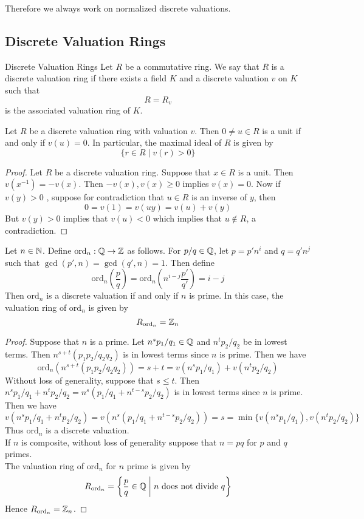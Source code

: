 \documentclass[a4paper]{article}
\begin{document}
Therefore we always work on normalized discrete valuations. 

\subsection{Discrete Valuation Rings}
\begin{defn}{Discrete Valuation Rings}{} Let $R$ be a commutative ring. We say that $R$ is a discrete valuation ring if there exists a field $K$ and a discrete valuation $v$ on $K$ such that $$R=R_v$$ is the associated valuation ring of $K$. 
\end{defn}

\begin{lmm}{}{} Let $R$ be a discrete valuation ring with valuation $v$. Then $0\neq u\in R$ is a unit if and only if $v(u)=0$. In particular, the maximal ideal of $R$ is given by $$\{r\in R\;|\;v(r)>0\}$$ 
\begin{proof}
Let $R$ be a discrete valuation ring. Suppose that $x\in R$ is a unit. Then $v(x^{-1})=-v(x)$. Then $-v(x),v(x)\geq 0$ implies $v(x)=0$. Now if $v(y)>0$ , suppose for contradiction that $u\in R$ is an inverse of $y$, then $$0=v(1)=v(uy)=v(u)+v(y)$$ But $v(y)>0$ implies that $v(u)<0$ which implies that $u\notin R$, a contradiction. 
\end{proof}
\end{lmm}

\begin{eg}{}{} Let $n\in\mathbb{N}$. Define $\text{ord}_n:\mathbb{Q}\to\mathbb{Z}$ as follows. For $p/q\in\mathbb{Q}$, let $p=p'n^i$ and $q=q'n^j$ such that $\gcd(p',n)=\gcd(q',n)=1$. Then define $$\text{ord}_n\left(\frac{p}{q}\right)=\text{ord}_n\left(n^{i-j}\frac{p'}{q'}\right)=i-j$$ Then $\text{ord}_n$ is a discrete valuation if and only if $n$ is prime. In this case, the valuation ring of $\text{ord}_n$ is given by $$R_{\text{ord}_n}=\mathbb{Z}_n$$ 
\begin{proof}
Suppose that $n$ is a prime. Let $n^sp_1/q_1\in\mathbb{Q}$ and $n^tp_2/q_2$ be in lowest terms. Then $n^{s+t}(p_1p_2/q_2q_2)$ is in lowest terms since $n$ is prime. Then we have $$\text{ord}_n(n^{s+t}(p_1p_2/q_2q_2))=s+t=v(n^sp_1/q_1)+v(n^tp_2/q_2)$$ Without loss of generality, suppose that $s\leq t$. Then $n^sp_1/q_1+n^tp_2/q_2=n^s(p_1/q_1+n^{t-s}p_2/q_2)$ is in lowest terms since $n$ is prime. Then we have $$v(n^sp_1/q_1+n^tp_2/q_2)=v(n^s(p_1/q_1+n^{t-s}p_2/q_2))=s=\min\{v(n^sp_1/q_1), v(n^tp_2/q_2)\}$$ Thus $\text{ord}_n$ is a discrete valuation. \\

If $n$ is composite, without loss of generality suppose that $n=pq$ for $p$ and $q$ primes. \\

The valuation ring of $\text{ord}_n$ for $n$ prime is given by $$R_{\text{ord}_n}=\left\{\frac{p}{q}\in\mathbb{Q}\;\bigg{|}\;n\text{ does not divide }q\right\}$$ Hence $R_{\text{ord}_n}=\mathbb{Z}_n$. 
\end{proof}
\end{eg}
\end{document}

